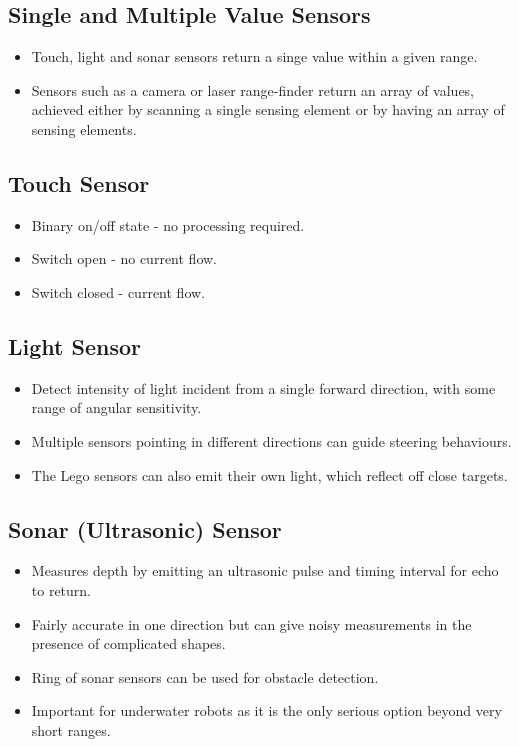 \documentclass[11pt]{article}
\begin{document}
\subsection{Single and Multiple Value Sensors}
\begin{itemize}
  \item Touch, light and sonar sensors return a singe value within a given range.
  \item Sensors such as a camera or laser range-finder return an array of values, achieved either by scanning a single sensing element or by having an array of sensing elements.
\end{itemize}

\subsection{Touch Sensor}
\begin{itemize}
  \item Binary on/off state - no processing required.
  \item Switch open - no current flow.
  \item Switch closed - current flow.
\end{itemize}

\subsection{Light Sensor}
\begin{itemize}
  \item Detect intensity of light incident from a single forward direction, with some range of angular sensitivity.
  \item Multiple sensors pointing in different directions can guide steering behaviours.
  \item The Lego sensors can also emit their own light, which reflect off close targets.
\end{itemize}

\subsection{Sonar (Ultrasonic) Sensor}
\begin{itemize}
  \item Measures depth by emitting an ultrasonic pulse and timing interval for echo to return.
  \item Fairly accurate in one direction but can give noisy measurements in the presence of complicated shapes.
  \item Ring of sonar sensors can be used for obstacle detection.
  \item Important for underwater robots as it is the only serious option beyond very short ranges.
\end{itemize}
\end{document}
